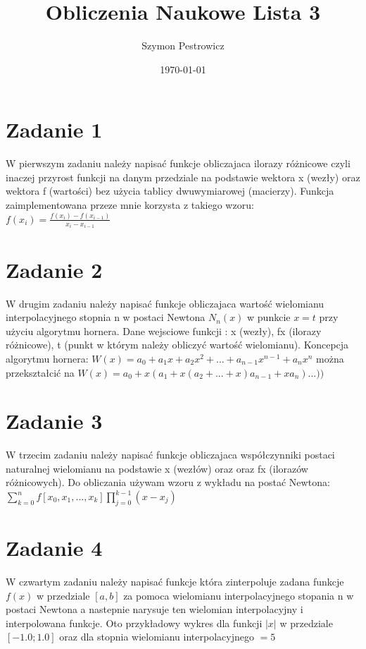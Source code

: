 \documentclass{article} %
\title{Obliczenia Naukowe Lista 3} %
\author{Szymon Pestrowicz} %
\date{\today} %
\begin{document}
	\maketitle %

	\section*{Zadanie 1} %

		W pierwszym zadaniu należy napisać funkcje obliczajaca ilorazy różnicowe czyli inaczej przyrost funkcji na danym przedziale na podstawie wektora x (wezły) oraz wektora f (wartości) bez użycia tablicy dwuwymiarowej (macierzy). Funkcja zaimplementowana przeze mnie korzysta z takiego wzoru: $f(x_i) = \frac{f(x_i) - f(x_{i-1})}{x_i - x_{i-1}}$


	\section*{Zadanie 2} %

		W drugim zadaniu należy napisać funkcje obliczajaca wartość wielomianu interpolacyjnego stopnia n w postaci Newtona $N_n(x)$ w punkcie $x=t$ przy użyciu algorytmu hornera. Dane wejsciowe funkcji : x (wezły), fx (ilorazy różnicowe), t (punkt w którym należy obliczyć wartość wielomianu). Koncepcja algorytmu hornera: $W(x) = a_0 + a_1x+a_2x^2+...+a_{n-1}x^{n-1}+a_nx^n$ można przekształcić na $W(x) = a_0 + x(a_1 + x(a_2 + ... + x)a_{n-1} + xa_n)...))$

	\section*{Zadanie 3} %
		
		W trzecim zadaniu należy napisać funkcje obliczajaca współczynniki postaci naturalnej wielomianu na podstawie x (wezłów) oraz oraz fx (ilorazów różnicowych). Do obliczania używam wzoru z wykładu na postać  Newtona: \\$\sum_{k=0}^{n} f[x_0,x_1,...,x_k]\prod_{j=0}^{k-1}(x-x_j)$

	\section*{Zadanie 4} %
		
		W czwartym zadaniu należy napisać funkcje która zinterpoluje zadana funkcje $f(x)$ w przedziale $[a,b]$ za pomoca wielomianu interpolacyjnego stopania n w postaci Newtona a nastepnie narysuje ten wielomian interpolacyjny i interpolowana funkcje. Oto przykładowy wykres dla funkcji $|x|$ w przedziale $[-1.0;1.0]$ oraz dla stopnia wielomianu interpolacyjnego $= 5$
		
\end{document}
